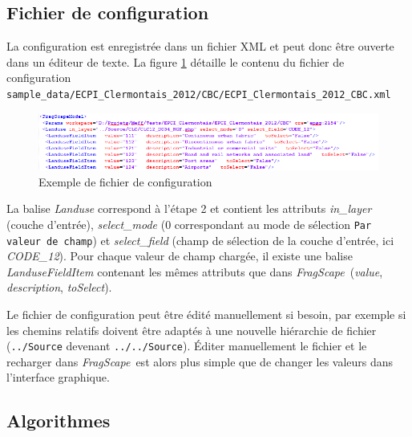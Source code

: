 \documentclass[11pt]{article}
\newcommand{\source}[1]{\vspace*{-0.4cm}\caption*{\textit{Source: {#1}}}}
\newcommand{\tool}{\emph{FragScape}}
\begin{document}
\subsection{Fichier de configuration}

La configuration est enregistrée dans un fichier XML et peut donc être ouverte dans un éditeur de texte. La figure \ref{fig:configFile} détaille le contenu du fichier de configuration \texttt{sample\_data/ECPI\_Clermontais\_2012/CBC/ECPI\_Clermontais\_2012\_CBC.xml}

\begin{figure}[h!]
    \centering
    \includegraphics[scale=0.8]{pictures/configFile.png}
    \caption{Exemple de fichier de configuration}
    \label{fig:configFile}
\end{figure}

La balise \textit{Landuse} correspond à l'étape 2 et contient les attributs \textit{in\_layer} (couche d'entrée), \textit{select\_mode} ($0$ correspondant au mode de sélection \texttt{Par valeur de champ}) et \textit{select\_field} (champ de sélection de la couche d'entrée, ici \textit{CODE\_12}).
Pour chaque valeur de champ chargée, il existe une balise \textit{LanduseFieldItem} contenant les mêmes attributs que dans \tool\ (\textit{value}, \textit{description}, \textit{toSelect}).

Le fichier de configuration peut être édité manuellement si besoin, par exemple si les chemins relatifs doivent être adaptés à une nouvelle hiérarchie de fichier (\texttt{../Source} devenant \texttt{../../Source}). Éditer manuellement le fichier et le recharger dans \tool\ est alors plus simple que de changer les valeurs dans l'interface graphique.


\subsection{Algorithmes}
\label{sec:algs}
\end{document}
